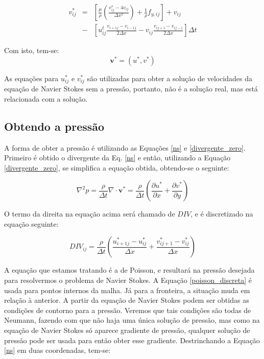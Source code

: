 \documentclass[journal]{IEEEtran}
\begin{document}
\begin{eqnarray}
v_{ij}^{*}&=&\left[\frac{\mu}{\rho}\left(\frac{v_{ij}^s-4v_{ij}}{\Delta
x^2}\right)+\frac{1}{\rho}f_{y,ij}\right] + v_{ij}\nonumber \\
&-&\left[u_{ij}^t\frac{v_{i+1j}-v_{i-1j}}{2\Delta
x}-v_{ij}\frac{v_{ij+1}-v_{ij-1}}{2\Delta x}\right]\Delta t
\end{eqnarray}

Com isto, tem-se:
\[\textbf{v}^{*}=(u^*,v^*)\]

As equações para $u_{ij}^{*}$ e $v_{ij}^{*}$ são utilizadas para obter a solução de velocidades da equação de Navier Stokes sem a pressão, portanto, não é a solução real, mas está relacionada com a solução.

\subsection{Obtendo a pressão}
A forma de obter a pressão é utilizando as Equações \ref{ns} e \ref{divergente_zero}. Primeiro é obtido o divergente da Eq. \ref{ns} e então, utilizando a Equação \ref{divergente_zero}, se simplifica a equação obtida, obtendo-se o seguinte:

\begin{equation}
\nabla^2 p = \frac{\rho}{\Delta t} \nabla\cdot \textbf{v}^*=\frac{\rho}{\Delta t} 
\left( \frac{\partial u^*}{\partial x}+\frac{\partial v^*}{\partial y} \right) \label{poisson_ns}
\end{equation}

O termo da direita na equação acima será chamado de $DIV$, e é discretizado na equação seguinte:

\begin{equation}
DIV_{ij}=\frac{\rho}{\Delta t}\left( \frac{u_{i+1j}^*-u_{ij}^*}{\Delta x}+\frac{v_{ij+1}^*-v_{ij}^*}{\Delta x}\right)
\end{equation}

A equação que estamos tratando é a de Poisson, e resultará na pressão desejada para resolvermos o problema de Navier Stokes. A Equação \ref{poisson_discreta} é usada para pontos internos da malha. Já para a fronteira, a situação muda em relação à anterior. A partir da equação de Navier Stokes podem ser obtidas as condições de contorno para a pressão. Veremos que tais condições são todas de Neumann, fazendo com que não haja uma única solução de pressão, mas como na equação de Navier Stokes só aparece gradiente de pressão, qualquer solução de pressão pode ser usada para então obter esse gradiente. Destrinchando a Equação \ref{ns} em duas coordenadas, tem-se:
\end{document}
